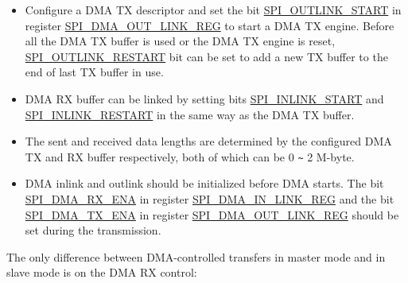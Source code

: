 \documentclass[main\_\_EN.tex]{subfiles}
\begin{document}
\begin{itemize}
    \item Configure a DMA TX descriptor and set the bit \hyperref[fielddesc:SPIOUTLINKSTART]{SPI\_OUTLINK\_START} in register \hyperref[regdesc:SPIDMAOUTLINKREG]{SPI\_DMA\_OUT\_LINK\_REG} to start a DMA TX engine. Before all the DMA TX buffer is used or the DMA TX engine is reset, \hyperref[fielddesc:SPIOUTLINKRESTART]{SPI\_OUTLINK\_RESTART} bit can be set to add a new TX buffer to the end of last TX buffer in use.

    \item DMA RX buffer can be linked by setting bits \hyperref[fielddesc:SPIINLINKSTART]{SPI\_INLINK\_START} and \hyperref[fielddesc:SPIINLINKRESTART]{SPI\_INLINK\_RESTART} in the same way as the DMA TX buffer.

    \item The sent and received data lengths are determined by the configured DMA TX and RX buffer respectively, both of which can be 0 \verb+~+ 2 M-byte.

    \item DMA inlink and outlink should be initialized before DMA starts. The bit \hyperref[fielddesc:SPIDMARXENA]{SPI\_DMA\_RX\_ENA} in register \hyperref[regdesc:SPIDMAINLINKREG]{SPI\_DMA\_IN\_LINK\_REG} and the bit \hyperref[fielddesc:SPIDMATXENA]{SPI\_DMA\_TX\_ENA} in register \hyperref[regdesc:SPIDMAOUTLINKREG]{SPI\_DMA\_OUT\_LINK\_REG} should be set during the transmission.

\end{itemize}

The only difference between DMA-controlled transfers in master mode and in slave mode is on the DMA RX control:
\end{document}

